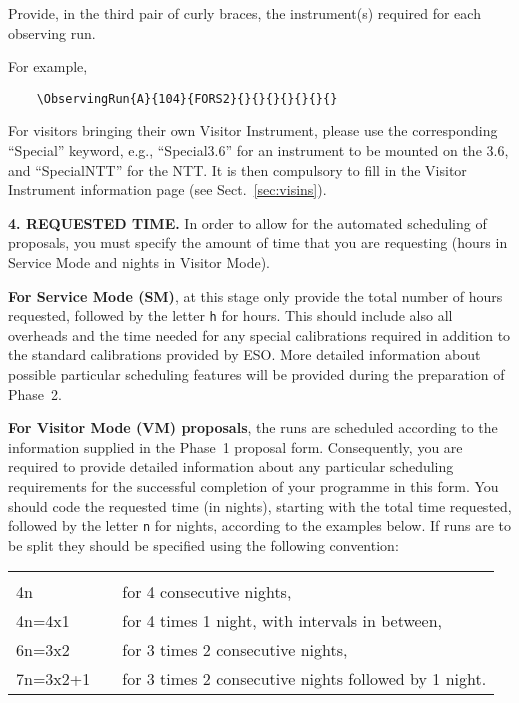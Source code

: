 \documentclass{article}
\begin{document}
Provide, in the third pair of curly braces, the instrument(s) required
for each observing run.  

For example, 
\begin{verbatim}
    \ObservingRun{A}{104}{FORS2}{}{}{}{}{}{}{}
\end{verbatim}

For visitors bringing their own Visitor Instrument, please use
the corresponding ``Special'' keyword, e.g., ``Special3.6'' for 
an instrument to be mounted on the 3.6, and ``SpecialNTT'' for the NTT.
It is then compulsory to fill in the Visitor Instrument information
page (see Sect.~\ref{sec:visins}).

\medskip

{\bf 4.  REQUESTED TIME.}  In order to allow for the automated
scheduling of proposals, you must specify the amount of time 
that you are requesting (hours in Service Mode and nights in Visitor
Mode). 

\smallskip

{\bf For Service Mode (SM)}, at this stage only provide the total
number of hours requested, followed by the letter \verb|h| for hours.
This should include also all overheads and the time needed for any special calibrations
required in addition to the standard calibrations provided by ESO.
More detailed information about possible particular scheduling
features will be provided during the preparation of Phase~2.

\smallskip

{\bf For Visitor Mode (VM) proposals}, the runs are scheduled
according to the information supplied in the Phase~1 proposal
form.  Consequently, you are required to provide detailed information 
about any particular scheduling requirements for the successful 
completion of your programme in this form.  You
should code the requested time (in nights), starting with the total
time requested, followed by the letter \verb|n| for nights, according
to the examples below.
If runs are to be split they should be specified using the following
convention:

\begin{tabular}{ll}
& \\
4n          & for 4 consecutive nights, \\
4n=4x1      & for 4 times 1 night, with intervals in between,\\
6n=3x2      & for 3 times 2 consecutive nights, \\
7n=3x2+1 \,\,\,\, & for 3 times 2 consecutive nights followed by 1 night. \\
\end{tabular}
\end{document}
